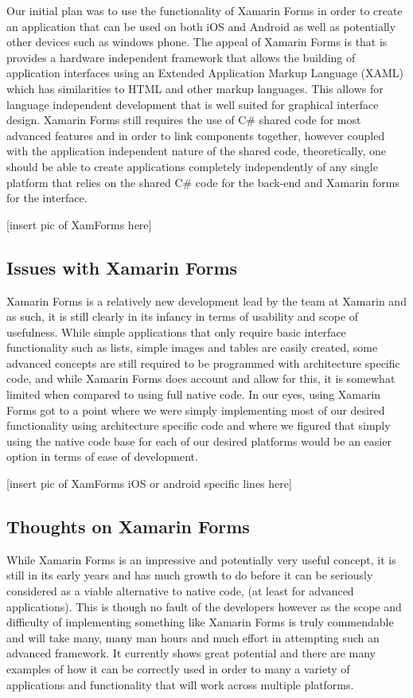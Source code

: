 \documentclass[main.tex]{subfiles}
\begin{document}
Our initial plan was to use the functionality of Xamarin Forms in order to create an application that can be used on both iOS and Android as well as potentially other devices such as windows phone. The appeal of Xamarin Forms is that is provides a hardware independent framework that allows the building of application interfaces using an Extended Application Markup Language (XAML) which has similarities to HTML and other markup languages. This allows for language independent development that is well suited for graphical interface design. Xamarin Forms still requires the use of C# shared code for most advanced features and in order to link components together, however coupled with the application independent nature of the shared code, theoretically, one should be able to create applications completely independently of any single platform that relies on the shared C# code for the back-end and Xamarin forms for the interface.

[insert pic of XamForms here]

\subsection{Issues with Xamarin Forms}

Xamarin Forms is a relatively new development lead by the team at Xamarin and as such, it is still clearly in its infancy in terms of usability and scope of usefulness. While simple applications that only require basic interface functionality such as lists, simple images and tables are easily created, some advanced concepts are still required to be programmed with architecture specific code, and while Xamarin Forms does account and allow for this, it is somewhat limited when compared to using full native code. In our eyes, using Xamarin Forms got to a point where we were simply implementing most of our desired functionality using architecture specific code and where we figured that simply using the native code base for each of our desired platforms would be an easier option in terms of ease of development.

[insert pic of XamForms iOS or android specific lines here]

\subsection{Thoughts on Xamarin Forms}
While Xamarin Forms is an impressive and potentially very useful concept, it is still in its early years and has much growth to do before it can be seriously considered as a viable alternative to native code, (at least for advanced applications). This is though no fault of the developers however as the scope and difficulty of implementing something like Xamarin Forms is truly commendable and will take many, many man hours and much effort in attempting such an advanced framework. It currently shows great potential and there are many examples of how it can be correctly used in order to many a variety of applications and functionality that will work across multiple platforms.
\end{document}
